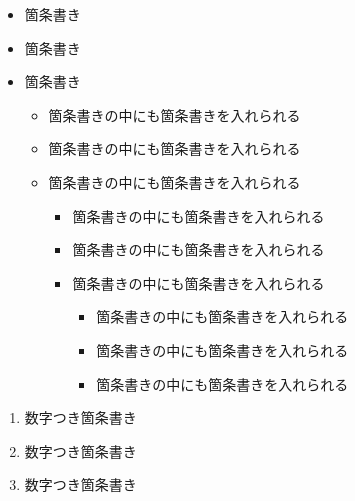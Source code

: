 \documentclass[titlepage, a4paper, 11pt, dvipdfmx]{jsarticle}
\begin{document}
\begin{itemize}
\item 箇条書き
\item 箇条書き
\item 箇条書き

\begin{itemize}
\item 箇条書きの中にも箇条書きを入れられる
\item 箇条書きの中にも箇条書きを入れられる
\item 箇条書きの中にも箇条書きを入れられる

\begin{itemize}
\item 箇条書きの中にも箇条書きを入れられる
\item 箇条書きの中にも箇条書きを入れられる
\item 箇条書きの中にも箇条書きを入れられる

\begin{itemize}
\item 箇条書きの中にも箇条書きを入れられる
\item 箇条書きの中にも箇条書きを入れられる
\item 箇条書きの中にも箇条書きを入れられる
\end{itemize}

\end{itemize}

\end{itemize}

\end{itemize}

\begin{enumerate}
\item 数字つき箇条書き
\item 数字つき箇条書き
\item 数字つき箇条書き
\end{enumerate}
\end{document}
